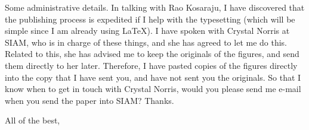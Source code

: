 \begin{letter}
\vspace{1in}

Some administrative details. 
In talking with Rao Kosaraju, I have discovered that the publishing
process is expedited if I help with the typesetting (which will be simple
since I am already using LaTeX).
I have spoken with Crystal Norris at SIAM, who is in charge of these things,
and she has agreed to let me do this.
Related to this, she has advised me to keep the originals of the figures, and
send them directly to her later.
Therefore, I have pasted copies of the figures directly into the copy that I 
have sent you, and have not sent you the originals.
So that I know when to get in touch with Crystal Norris,
would you please send me e-mail when you send the paper into SIAM?
Thanks.

\closing{All of the best,}
\end{letter}

